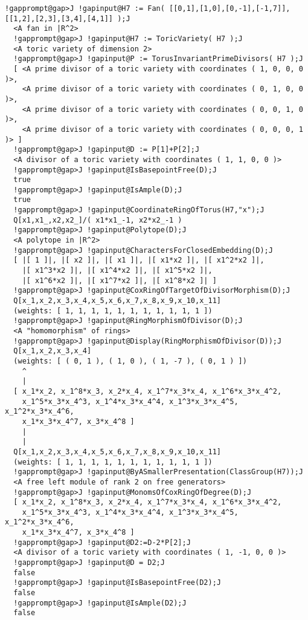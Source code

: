 \documentclass[a4paper,11pt]{report}
\begin{document}
{{{\begin{Verbatim}[commandchars=!@J,fontsize=\small,frame=single,label=Example]
  !gapprompt@gap>J !gapinput@H7 := Fan( [[0,1],[1,0],[0,-1],[-1,7]],[[1,2],[2,3],[3,4],[4,1]] );J
  <A fan in |R^2>
  !gapprompt@gap>J !gapinput@H7 := ToricVariety( H7 );J
  <A toric variety of dimension 2>
  !gapprompt@gap>J !gapinput@P := TorusInvariantPrimeDivisors( H7 );J
  [ <A prime divisor of a toric variety with coordinates ( 1, 0, 0, 0 )>,
    <A prime divisor of a toric variety with coordinates ( 0, 1, 0, 0 )>,
    <A prime divisor of a toric variety with coordinates ( 0, 0, 1, 0 )>,
    <A prime divisor of a toric variety with coordinates ( 0, 0, 0, 1 )> ]
  !gapprompt@gap>J !gapinput@D := P[1]+P[2];J
  <A divisor of a toric variety with coordinates ( 1, 1, 0, 0 )>
  !gapprompt@gap>J !gapinput@IsBasepointFree(D);J
  true
  !gapprompt@gap>J !gapinput@IsAmple(D);J
  true
  !gapprompt@gap>J !gapinput@CoordinateRingOfTorus(H7,"x");J
  Q[x1,x1_,x2,x2_]/( x1*x1_-1, x2*x2_-1 )
  !gapprompt@gap>J !gapinput@Polytope(D);J
  <A polytope in |R^2>
  !gapprompt@gap>J !gapinput@CharactersForClosedEmbedding(D);J
  [ |[ 1 ]|, |[ x2 ]|, |[ x1 ]|, |[ x1*x2 ]|, |[ x1^2*x2 ]|, 
    |[ x1^3*x2 ]|, |[ x1^4*x2 ]|, |[ x1^5*x2 ]|, 
    |[ x1^6*x2 ]|, |[ x1^7*x2 ]|, |[ x1^8*x2 ]| ]
  !gapprompt@gap>J !gapinput@CoxRingOfTargetOfDivisorMorphism(D);J
  Q[x_1,x_2,x_3,x_4,x_5,x_6,x_7,x_8,x_9,x_10,x_11]
  (weights: [ 1, 1, 1, 1, 1, 1, 1, 1, 1, 1, 1 ])
  !gapprompt@gap>J !gapinput@RingMorphismOfDivisor(D);J
  <A "homomorphism" of rings>
  !gapprompt@gap>J !gapinput@Display(RingMorphismOfDivisor(D));J
  Q[x_1,x_2,x_3,x_4]
  (weights: [ ( 0, 1 ), ( 1, 0 ), ( 1, -7 ), ( 0, 1 ) ])
    ^
    |
  [ x_1*x_2, x_1^8*x_3, x_2*x_4, x_1^7*x_3*x_4, x_1^6*x_3*x_4^2, 
    x_1^5*x_3*x_4^3, x_1^4*x_3*x_4^4, x_1^3*x_3*x_4^5, x_1^2*x_3*x_4^6, 
    x_1*x_3*x_4^7, x_3*x_4^8 ]
    |
    |
  Q[x_1,x_2,x_3,x_4,x_5,x_6,x_7,x_8,x_9,x_10,x_11]
  (weights: [ 1, 1, 1, 1, 1, 1, 1, 1, 1, 1, 1 ])
  !gapprompt@gap>J !gapinput@ByASmallerPresentation(ClassGroup(H7));J
  <A free left module of rank 2 on free generators>
  !gapprompt@gap>J !gapinput@MonomsOfCoxRingOfDegree(D);J
  [ x_1*x_2, x_1^8*x_3, x_2*x_4, x_1^7*x_3*x_4, x_1^6*x_3*x_4^2, 
    x_1^5*x_3*x_4^3, x_1^4*x_3*x_4^4, x_1^3*x_3*x_4^5, x_1^2*x_3*x_4^6, 
    x_1*x_3*x_4^7, x_3*x_4^8 ]
  !gapprompt@gap>J !gapinput@D2:=D-2*P[2];J
  <A divisor of a toric variety with coordinates ( 1, -1, 0, 0 )>
  !gapprompt@gap>J !gapinput@D = D2;J
  false
  !gapprompt@gap>J !gapinput@IsBasepointFree(D2);J
  false
  !gapprompt@gap>J !gapinput@IsAmple(D2);J
  false
\end{Verbatim}
 
}}}
\end{document}
